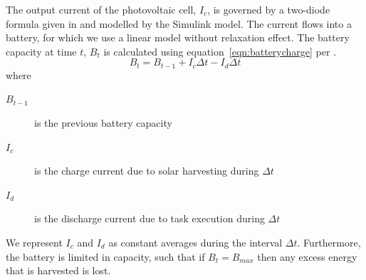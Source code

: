 The output current of the photovoltaic cell, $I_c$, is governed by a two-diode formula given in \cite{marwali1997probabilistic} and modelled by the Simulink model.  The current flows into a battery, for which we use a linear model without relaxation effect.  The battery capacity at time $t$, $B_t$ is calculated using equation~\ref{eqn:batterycharge} per \cite{niyato2007sleep}.
\begin{equation}
 B_t = B_{t-1} + I_c \Delta t - I_d \Delta t
\label{eqn:batterycharge}
\end{equation}
where 
\begin{description}
\item[$B_{t-1}$] is the previous battery capacity
\item[$I_c$] is the charge current due to solar harvesting during $\Delta t$
\item[$I_d$] is the discharge current due to task execution during $\Delta t$
\end{description}
We represent $I_c$ and $I_d$  as constant averages during the interval $\Delta t$. Furthermore, the battery is
limited in capacity, such that if $B_t = B_{max}$ then any excess energy that is harvested is lost.

